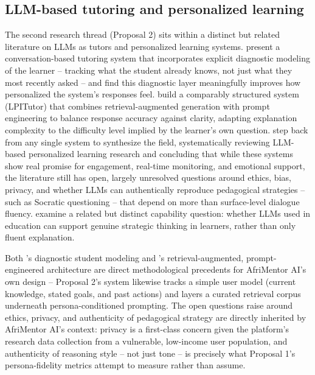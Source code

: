 \subsection{LLM-based tutoring and personalized learning}

The second research thread (Proposal 2) sits within a distinct but related literature on LLMs as tutors and personalized learning systems. \citet{park2024tutoring} present a conversation-based tutoring system that incorporates explicit diagnostic modeling of the learner -- tracking what the student already knows, not just what they most recently asked -- and find this diagnostic layer meaningfully improves how personalized the system's responses feel. \citet{liu2025lpitutor} build a comparably structured system (LPITutor) that combines retrieval-augmented generation with prompt engineering to balance response accuracy against clarity, adapting explanation complexity to the difficulty level implied by the learner's own question. \citet{sharma2025review} step back from any single system to synthesize the field, systematically reviewing LLM-based personalized learning research and concluding that while these systems show real promise for engagement, real-time monitoring, and emotional support, the literature still has open, largely unresolved questions around ethics, bias, privacy, and whether LLMs can authentically reproduce pedagogical strategies -- such as Socratic questioning -- that depend on more than surface-level dialogue fluency. \citet{grassucci2025strategic} examine a related but distinct capability question: whether LLMs used in education can support genuine strategic thinking in learners, rather than only fluent explanation.

Both \citet{park2024tutoring}'s diagnostic student modeling and \citet{liu2025lpitutor}'s retrieval-augmented, prompt-engineered architecture are direct methodological precedents for AfriMentor AI's own design -- Proposal 2's system likewise tracks a simple user model (current knowledge, stated goals, and past actions) and layers a curated retrieval corpus underneath persona-conditioned prompting. The open questions \citet{sharma2025review} raise around ethics, privacy, and authenticity of pedagogical strategy are directly inherited by AfriMentor AI's context: privacy is a first-class concern given the platform's research data collection from a vulnerable, low-income user population, and authenticity of reasoning style -- not just tone -- is precisely what Proposal 1's persona-fidelity metrics attempt to measure rather than assume.

